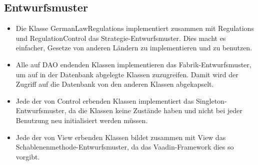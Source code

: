     \subsection{Entwurfsmuster}
        \begin{itemize}
            \item Die Klasse GermanLawRegulations implementiert zusammen mit Regulations und RegulationControl das Strategie-Entwurfsmuster.
                Dies macht es einfacher, Gesetze von anderen Ländern zu implementieren und zu benutzen.
            \item Alle auf DAO endenden Klassen implementieren das Fabrik-Entwurfsmuster, um auf in der Datenbank abgelegte Klassen zuzugreifen.
                Damit wird der Zugriff auf die Datenbank von den anderen Klassen abgekapselt.
            \item Jede der von Control erbenden Klassen implementiert das Singleton-Entwurfsmuster, da die Klassen keine Zustände haben und nicht bei jeder Benutzung neu initialisiert werden müssen.
            \item Jede der von View erbenden Klassen bildet zusammen mit View das Schablenenmethode-Entwurfsmuster, da das Vaadin-Framework dies so vorgibt.
        \end{itemize}
